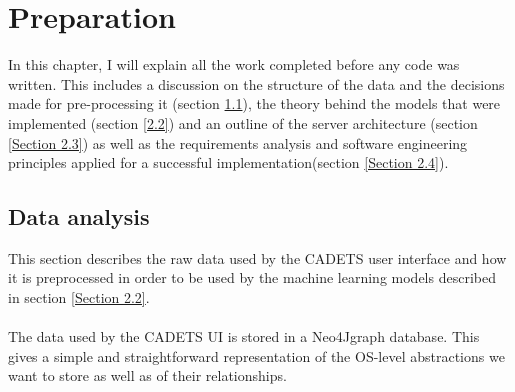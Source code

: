 
	\chapter{Preparation}
	In this chapter, I will explain all the work completed before any code was written. This includes a discussion on the structure of the data and the decisions made for pre-processing it (section \ref{Section 2.1}), the theory behind the models that were implemented (section \ref{2.2}) and an outline of the server architecture (section \ref{Section 2.3}) as well as the requirements analysis and software engineering principles applied for a successful implementation(section \ref{Section 2.4}).
	
	\section{Data analysis} \label{Section 2.1}
	This section describes the raw data used by the CADETS user interface and how it is preprocessed in order to be used by the machine learning models described in section \ref{Section 2.2}.
	\\ \\
	The data used by the CADETS UI is stored in a Neo4J\footnotemark[1] graph database. This gives a simple and straightforward representation of the OS-level abstractions we want to store as well as of their relationships.

	

